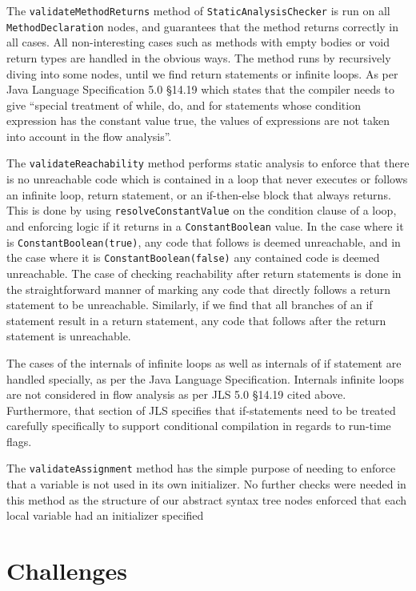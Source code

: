 \documentclass[letterpaper]{article}
\begin{document}
  The {\tt validateMethodReturns} method of {\tt StaticAnalysisChecker} is run
  on all {\tt MethodDeclaration} nodes, and guarantees that the method returns
  correctly in all cases. All non-interesting cases such as methods with empty
  bodies or void return types are handled in the obvious ways. The method runs
  by recursively diving into some nodes, until we find return statements or
  infinite loops. As per Java Language Specification 5.0 \S 14.19 which states
  that the compiler needs to give ``special treatment of while, do, and for
  statements whose condition expression has the constant value true, the values
  of expressions are not taken into account in the flow analysis''.

  The {\tt validateReachability} method performs static analysis to enforce that
  there is no unreachable code which is contained in a loop that never executes
  or follows an infinite loop, return statement, or an if-then-else block that
  always returns. This is done by using {\tt resolveConstantValue} on the
  condition clause of a loop, and enforcing logic if it returns in a
  {\tt ConstantBoolean} value. In the case where it is
  {\tt ConstantBoolean(true)}, any code that follows is deemed unreachable, and
  in the case where it is {\tt ConstantBoolean(false)} any contained code is
  deemed unreachable. The case of checking reachability after return statements
  is done in the straightforward manner of marking any code that directly follows
  a return statement to be unreachable. Similarly, if we find that all branches
  of an if statement result in a return statement, any code that follows after
  the return statement is unreachable.

  The cases of the internals of infinite loops as well as internals of if
  statement are handled specially, as per the Java Language Specification.
  Internals infinite loops are not considered in flow analysis as per
  JLS 5.0 \S 14.19 cited above. Furthermore, that section of JLS specifies that
  if-statements need to be treated carefully specifically to support conditional
  compilation in regards to run-time flags.

  The {\tt validateAssignment} method has the simple purpose of needing to
  enforce that a variable is not used in its own initializer. No further checks
  were needed in this method as the structure of our abstract syntax tree nodes
  enforced that each local variable had an initializer specified

  \section{Challenges}
\end{document}
